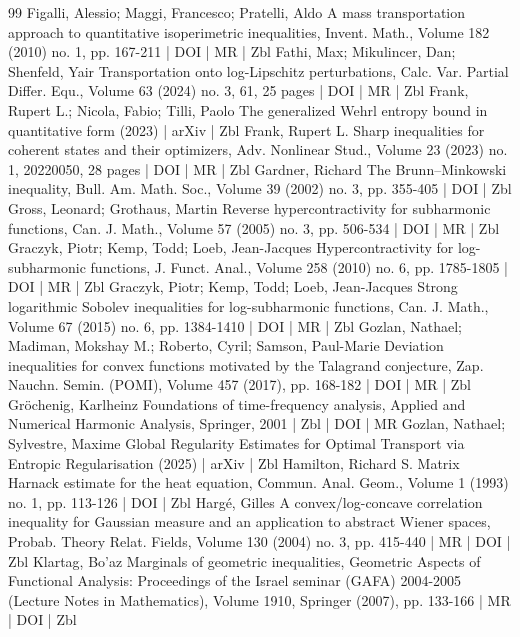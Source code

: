 \begin{thebibliography}{99}
 Figalli, Alessio; Maggi, Francesco; Pratelli, Aldo A mass transportation approach to quantitative isoperimetric inequalities, Invent. Math., Volume 182 (2010) no. 1, pp. 167-211 | DOI | MR | Zbl
 Fathi, Max; Mikulincer, Dan; Shenfeld, Yair Transportation onto log-Lipschitz perturbations, Calc. Var. Partial Differ. Equ., Volume 63 (2024) no. 3, 61, 25 pages | DOI | MR | Zbl
 Frank, Rupert L.; Nicola, Fabio; Tilli, Paolo The generalized Wehrl entropy bound in quantitative form (2023) | arXiv | Zbl
 Frank, Rupert L. Sharp inequalities for coherent states and their optimizers, Adv. Nonlinear Stud., Volume 23 (2023) no. 1, 20220050, 28 pages | DOI | MR | Zbl
 Gardner, Richard The Brunn–Minkowski inequality, Bull. Am. Math. Soc., Volume 39 (2002) no. 3, pp. 355-405 | DOI | Zbl
 Gross, Leonard; Grothaus, Martin Reverse hypercontractivity for subharmonic functions, Can. J. Math., Volume 57 (2005) no. 3, pp. 506-534 | DOI | MR | Zbl
 Graczyk, Piotr; Kemp, Todd; Loeb, Jean-Jacques Hypercontractivity for log-subharmonic functions, J. Funct. Anal., Volume 258 (2010) no. 6, pp. 1785-1805 | DOI | MR | Zbl
 Graczyk, Piotr; Kemp, Todd; Loeb, Jean-Jacques Strong logarithmic Sobolev inequalities for log-subharmonic functions, Can. J. Math., Volume 67 (2015) no. 6, pp. 1384-1410 | DOI | MR | Zbl
 Gozlan, Nathael; Madiman, Mokshay M.; Roberto, Cyril; Samson, Paul-Marie Deviation inequalities for convex functions motivated by the Talagrand conjecture, Zap. Nauchn. Semin. (POMI), Volume 457 (2017), pp. 168-182 | DOI | MR | Zbl
 Gröchenig, Karlheinz Foundations of time-frequency analysis, Applied and Numerical Harmonic Analysis, Springer, 2001 | Zbl | DOI | MR
 Gozlan, Nathael; Sylvestre, Maxime Global Regularity Estimates for Optimal Transport via Entropic Regularisation (2025) | arXiv | Zbl
 Hamilton, Richard S. Matrix Harnack estimate for the heat equation, Commun. Anal. Geom., Volume 1 (1993) no. 1, pp. 113-126 | DOI | Zbl
 Hargé, Gilles A convex/log-concave correlation inequality for Gaussian measure and an application to abstract Wiener spaces, Probab. Theory Relat. Fields, Volume 130 (2004) no. 3, pp. 415-440 | MR | DOI | Zbl
 Klartag, Bo’az Marginals of geometric inequalities, Geometric Aspects of Functional Analysis: Proceedings of the Israel seminar (GAFA) 2004-2005 (Lecture Notes in Mathematics), Volume 1910, Springer (2007), pp. 133-166 | MR | DOI | Zbl

\end{thebibliography}
